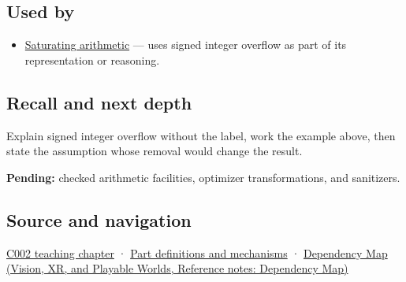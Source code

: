 \subsection{Used by}\label{appendix-1a599c924a4e-used-by}

\hypertarget{appendix-1a599c924a4e-used-by}{}

\begin{itemize}
\tightlist
\item
  \hyperref[appendix-3999c6209649]{Saturating arithmetic} --- uses signed integer overflow as part of its representation or reasoning.
\end{itemize}

\subsection{Recall and next depth}\label{appendix-1a599c924a4e-recall-and-next-depth}

\hypertarget{appendix-1a599c924a4e-recall-and-next-depth}{}

Explain signed integer overflow without the label, work the example above, then state the assumption whose removal would change the result.

\textbf{Pending:} checked arithmetic facilities, optimizer transformations, and sanitizers.

\subsection{Source and navigation}\label{appendix-1a599c924a4e-source-and-navigation}

\hypertarget{appendix-1a599c924a4e-source-and-navigation}{}

\hyperref[01-foundations-i-ch001-arithmetic-becomes-a-policy]{C002 teaching chapter} · \hyperref[appendix-fd090d982a15]{Part definitions and mechanisms} · \href{../07-Vision-XR-and-Playable-Worlds/main.pdf\#nameddest=appendix-4ad47bdd269a}{Dependency Map (Vision, XR, and Playable Worlds, Reference notes: Dependency Map)}
